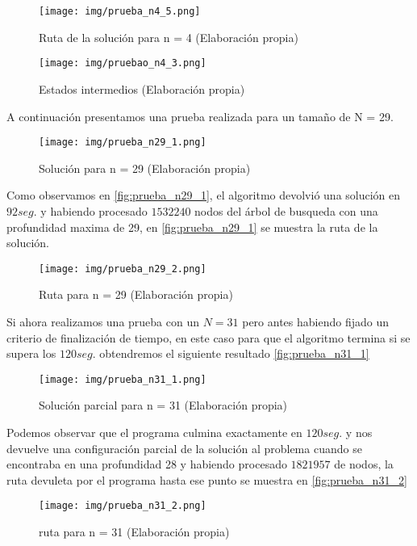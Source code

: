 \documentclass[conference]{IEEEtran}
\begin{document}
\begin{figure}[h]
    \centering
    \texttt{[image: img/prueba\_n4\_5.png]}
    \caption{Ruta de la solución para n = 4 (Elaboración propia)}
    \label{fig:prueba_n4_5}
\end{figure} 

\begin{figure}[h]
    \centering
    \texttt{[image: img/pruebao\_n4\_3.png]}
    \caption{Estados intermedios (Elaboración propia)}
    \label{fig:pruebao_n4_3}
\end{figure} 

A continuación presentamos una prueba realizada para un tamaño de N = 29.

\begin{figure}[h]
    \centering
    \texttt{[image: img/prueba\_n29\_1.png]}
    \caption{Solución para n = 29 (Elaboración propia)}
    \label{fig:prueba_n29_1}
\end{figure} 

Como observamos en \autoref{fig:prueba_n29_1}, el algoritmo devolvió una solución en $92 seg.$ y habiendo procesado $1532240$ nodos del árbol de busqueda con una profundidad maxima de 29, en \autoref{fig:prueba_n29_1} se muestra la ruta de la solución.

\begin{figure}[h]
    \centering
    \texttt{[image: img/prueba\_n29\_2.png]}
    \caption{Ruta para n = 29 (Elaboración propia)}
    \label{fig:prueba_n29_2}
\end{figure} 
Si ahora realizamos una prueba con un $N=31$ pero antes habiendo fijado un criterio de finalización de tiempo, en este caso para que el algoritmo termina si se supera los $120 seg.$ obtendremos el siguiente resultado \autoref{fig:prueba_n31_1}

\begin{figure}[h]
    \centering
    \texttt{[image: img/prueba\_n31\_1.png]}
    \caption{Solución parcial para n = 31 (Elaboración propia)}
    \label{fig:prueba_n31_1}
\end{figure} 

Podemos observar que el programa culmina exactamente en $120 seg.$ y nos devuelve una configuración parcial de la solución al problema cuando se encontraba en una profundidad 28 y habiendo procesado $1821957$ de nodos, la ruta devuleta por el programa hasta ese punto se muestra en \autoref{fig:prueba_n31_2}

\begin{figure}[h]
    \centering
    \texttt{[image: img/prueba\_n31\_2.png]}
    \caption{ruta para n = 31 (Elaboración propia)}
    \label{fig:prueba_n31_2}
\end{figure} 
\end{document}
